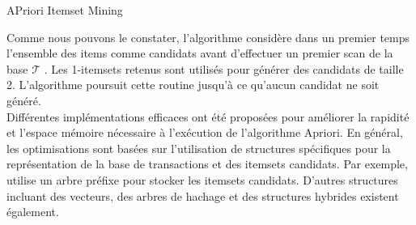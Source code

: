 \documentclass[a4paper,10pt]{report}
\begin{document}
\begin{algorithm}[H]
\caption{APriori Itemset Mining}


\end{algorithm}

\hspace{0.15cm}Comme nous pouvons le constater, l'algorithme considère dans un premier temps l'ensemble des items comme candidats avant d'effectuer un premier scan de la base $\mathcal{ T }$ . Les 1-itemsets retenus sont utilisés pour générer des candidats de taille 2. L'algorithme poursuit cette routine jusqu'à ce qu'aucun candidat ne soit généré. \\

\hspace{0.15cm}Différentes implémentations efficaces ont été proposées pour améliorer la rapidité et l'espace mémoire nécessaire à l'exécution de l'algorithme Apriori. En général, les optimisations sont basées sur l'utilisation de structures spécifiques pour la représentation de la base de transactions et des itemsets candidats. Par exemple, \cite{BRI97} utilise un arbre préfixe pour stocker les itemsets candidats. D'autres structures incluant des vecteurs, des arbres de hachage et des structures hybrides existent également.\\
\end{document}
